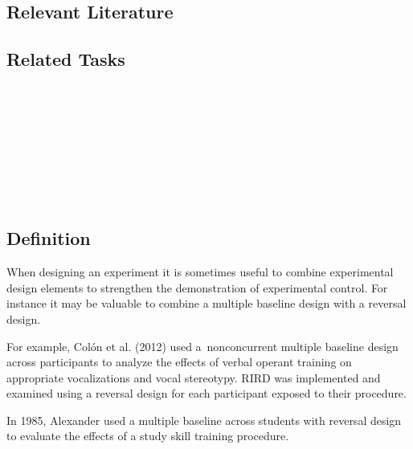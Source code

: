 \subsection{Relevant Literature}
\begin{refsection}
\nocite{test,alang2017police,clayton2018black}
\printbibliography[heading=none]
\end{refsection}
%
\subsection{Related Tasks}
\fourbThree{}\\
\fourbSeven{}\\
\fourhOne{}\\
\fourhTwo{}\\
\fourhFour{}\\
\fouriFive{}\\
\fourFKThirtySix{}\\
%
%
%
%
%
%
\section{\fourbNine{}}
\subsection{Definition}
When designing an experiment it is sometimes useful to combine experimental design elements to strengthen the demonstration of experimental control. For instance it may be valuable to combine a multiple baseline design with a reversal design. 

For example, Colón et al. (2012) used a nonconcurrent multiple baseline design across participants to analyze the effects of verbal operant training on appropriate vocalizations and vocal stereotypy. RIRD was implemented and examined using a reversal design for each participant exposed to their procedure.

In 1985, Alexander used a multiple baseline across students with reversal design to evaluate the effects of a study skill training procedure.


